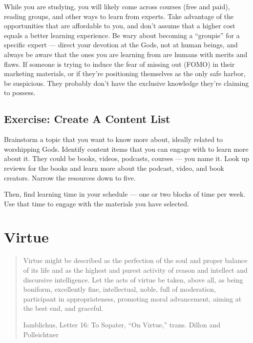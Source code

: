 \documentclass[
]{book}
\begin{document}
While you are studying, you will likely come across courses (free and paid), reading groups, and other ways to learn from experts. Take advantage of the opportunities that are affordable to you, and don't assume that a higher cost equals a better learning experience. Be wary about becoming a ``groupie'' for a specific expert --- direct your devotion at the Gods, not at human beings, and always be aware that the ones you are learning from are humans with merits and flaws. If someone is trying to induce the fear of missing out (FOMO) in their marketing materials, or if they're positioning themselves as the only safe harbor, be suspicious. They probably don't have the exclusive knowledge they're claiming to possess.

\hypertarget{exercise-create-a-content-list}{%
\section{Exercise: Create A Content List}\label{exercise-create-a-content-list}}

Brainstorm a topic that you want to know more about, ideally related to worshipping Gods. Identify content items that you can engage with to learn more about it. They could be books, videos, podcasts, courses --- you name it. Look up reviews for the books and learn more about the podcast, video, and book creators. Narrow the resources down to five.

Then, find learning time in your schedule --- one or two blocks of time per week. Use that time to engage with the materials you have selected.

\hypertarget{virtue}{%
\chapter{Virtue}\label{virtue}}

\begin{quote}
Virtue might be described as the perfection of the soul and proper balance of its life and as the highest and purest activity of reason and intellect and discursive intelligence. Let the acts of virtue be taken, above all, as being boniform, excellently fine, intellectual, noble, full of moderation, participant in appropriateness, promoting moral advancement, aiming at the best end, and graceful.

Iamblichus, Letter 16: To Sopater, ``On Virtue,'' trans. Dillon and Polleichtner
\end{quote}
\end{document}
